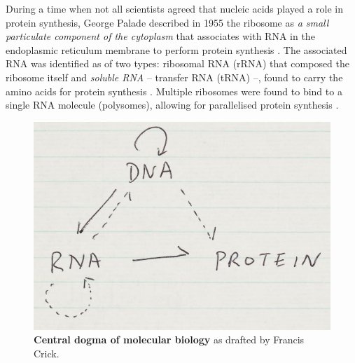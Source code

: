 During a time when not all scientists agreed that nucleic acids played a role in protein synthesis, George Palade described in 1955 the ribosome as \emph{a small particulate component of the cytoplasm} that associates with RNA in the endoplasmic reticulum membrane to perform protein synthesis \cite{palade:1955tf,jacob:1961uh}. The associated RNA was identified as of two types: ribosomal RNA (rRNA) that composed the ribosome itself and \emph{soluble RNA} -- transfer RNA (tRNA) --, found to carry the amino acids for protein synthesis \cite{hoagland:1958vm,jacob:1961uh}. Multiple ribosomes were found to bind to a single RNA molecule (polysomes), allowing for parallelised protein synthesis \cite{warner:1963uj}.

\begin{figure}
  \vspace{-\intextsep}
  \includegraphics[width=\linewidth]{images/intro/crick-central-dogma cropped}
  \caption[Central dogma of molecular biology]{\textbf{Central dogma of molecular biology} as drafted by Francis Crick.}
  \label{fig:central-dogma}
  \vspace{-\intextsep}
\end{figure}

